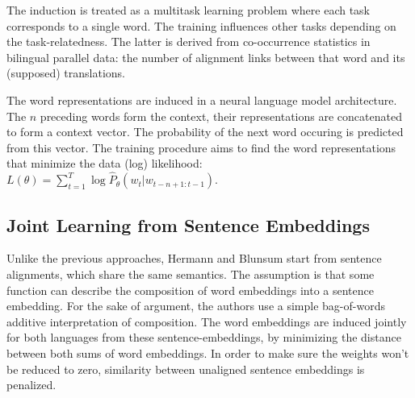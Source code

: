 \documentclass[twocolumn]{article}
\begin{document}
The induction is treated as a multitask learning problem where each task corresponds to a single word. The training influences other tasks depending on the task-relatedness. The latter is derived from co-occurrence statistics in bilingual parallel data: the number of alignment links between  that word and its (supposed) translations. 

The word representations are induced in a neural language model architecture. 
The $n$ preceding words form the context, their representations are concatenated to form a context vector. The probability of the next word occuring is predicted from this vector. The training procedure aims to find the word representations that minimize the data (log) likelihood: 
$L(\theta) = \sum_{t=1}^T \log \hat{P}_\theta (w_t|w_{t-n+1:t-1})$. 



\subsection{Joint Learning from Sentence Embeddings}
Unlike the previous approaches, Hermann and Blunsum \cite{hermann2013multilingual} start from sentence alignments, which share the same semantics.
The assumption is that some function can describe the composition of word embeddings into a sentence embedding.
For the sake of argument, the authors use a simple bag-of-words additive interpretation of composition. 
The word embeddings are induced jointly for both languages from these sentence-embeddings, by minimizing the distance between both sums of word embeddings.
In order to make sure the weights won't be reduced to zero, similarity between unaligned sentence embeddings is penalized.

\end{document}
